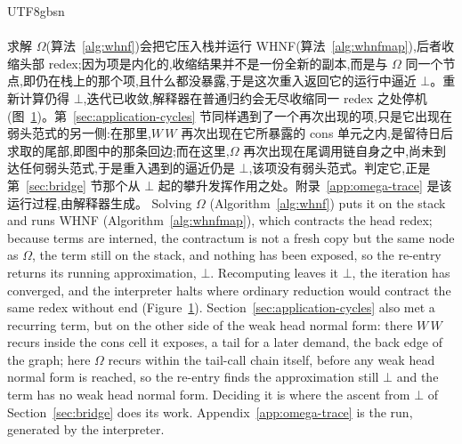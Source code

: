 \begin{CJK*}{UTF8}{gbsn}
  \paragraph{}
  \ifPaperChinese
  求解 $\Omega$(算法~\ref{alg:whnf})会把它压入栈并运行 \textsf{WHNF}(算法~\ref{alg:whnfmap}),后者收缩头部 redex;因为项是内化的,收缩结果并不是一份全新的副本,而是与 $\Omega$ 同一个节点,即仍在栈上的那个项,且什么都没暴露,于是这次重入返回它的运行中逼近 $\bot$。重新计算仍得 $\bot$,迭代已收敛,解释器在普通归约会无尽收缩同一 redex 之处停机(图~\ref{fig:omega})。第~\ref{sec:application-cycles} 节同样遇到了一个再次出现的项,只是它出现在弱头范式的另一侧:在那里,$W\,W$ 再次出现在它所暴露的 cons 单元之内,是留待日后求取的尾部,即图中的那条回边;而在这里,$\Omega$ 再次出现在尾调用链自身之中,尚未到达任何弱头范式,于是重入遇到的逼近仍是 $\bot$,该项没有弱头范式。判定它,正是第~\ref{sec:bridge} 节那个从 $\bot$ 起的攀升发挥作用之处。附录~\ref{app:omega-trace} 是该运行过程,由解释器生成。
  \else
  Solving $\Omega$ (Algorithm~\ref{alg:whnf}) puts it on the stack and runs \textsf{WHNF} (Algorithm~\ref{alg:whnfmap}), which contracts the head redex; because terms are interned, the contractum is not a fresh copy but the same node as $\Omega$, the term still on the stack, and nothing has been exposed, so the re-entry returns its running approximation, $\bot$. Recomputing leaves it $\bot$, the iteration has converged, and the interpreter halts where ordinary reduction would contract the same redex without end (Figure~\ref{fig:omega}). Section~\ref{sec:application-cycles} also met a recurring term, but on the other side of the weak head normal form: there $W\,W$ recurs inside the cons cell it exposes, a tail for a later demand, the back edge of the graph; here $\Omega$ recurs within the tail-call chain itself, before any weak head normal form is reached, so the re-entry finds the approximation still $\bot$ and the term has no weak head normal form. Deciding it is where the ascent from $\bot$ of Section~\ref{sec:bridge} does its work. Appendix~\ref{app:omega-trace} is the run, generated by the interpreter.
  \fi

  \begin{figure}
    \centering
    
    \caption{}
    \label{fig:omega}
  \end{figure}


\end{CJK*}

